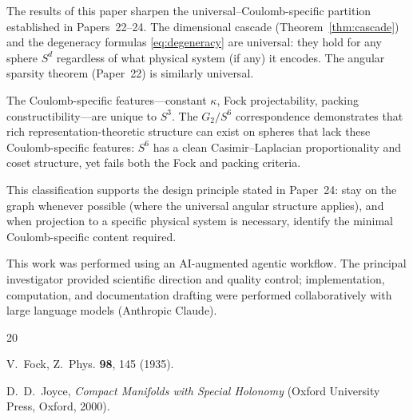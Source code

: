 \documentclass[twocolumn,pra,amsmath,amssymb,superscriptaddress]{revtex4-2}
\begin{document}
The results of this paper sharpen the universal--Coulomb-specific
partition established in Papers~22--24.  The dimensional cascade
(Theorem~\ref{thm:cascade}) and the degeneracy formulas
\eqref{eq:degeneracy} are universal: they hold for any sphere
$S^d$ regardless of what physical system (if any) it encodes.
The angular sparsity theorem (Paper~22) is similarly universal.

The Coulomb-specific features---constant $\kappa$, Fock
projectability, packing constructibility---are unique to $S^3$.
The $G_2/S^6$ correspondence demonstrates that rich
representation-theoretic structure can exist on spheres that
lack these Coulomb-specific features: $S^6$ has a clean
Casimir--Laplacian proportionality and coset structure, yet
fails both the Fock and packing criteria.

This classification supports the design principle stated in
Paper~24: stay on the graph whenever possible (where the universal
angular structure applies), and when projection to a specific
physical system is necessary, identify the minimal
Coulomb-specific content required.


\begin{acknowledgments}
This work was performed using an AI-augmented agentic workflow.
The principal investigator provided scientific direction and quality
control; implementation, computation, and documentation drafting
were performed collaboratively with large language models (Anthropic
Claude).
\end{acknowledgments}


\begin{thebibliography}{20}

V.~Fock, Z.~Phys. \textbf{98}, 145 (1935).

D.~D.~Joyce, \textit{Compact Manifolds with Special Holonomy}
(Oxford University Press, Oxford, 2000).

\end{thebibliography}
\end{document}

